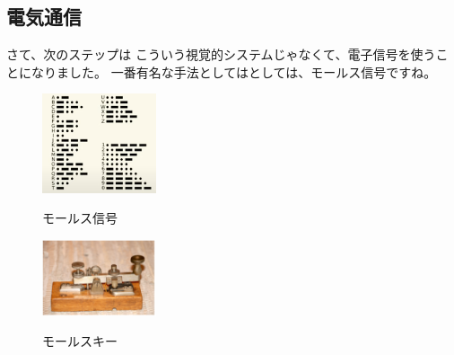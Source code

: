 \subsection{電気通信}
さて、次のステップは
こういう視覚的システムじゃなくて、電子信号を使うことになりました。
一番有名な手法としてはとしては、モールス信号ですね。
\begin{figure}[H]
    \includegraphics[width=0.3\textwidth]{lesson1/morse.eps}
    \label{fig: 1}
    \caption{モールス信号}
\end{figure}
\begin{figure}[H]
    \includegraphics[width=0.3\textwidth]{lesson1/morsekey.eps}
    \label{fig: 1}
    \caption{モールスキー}
\end{figure}
\iffalse
